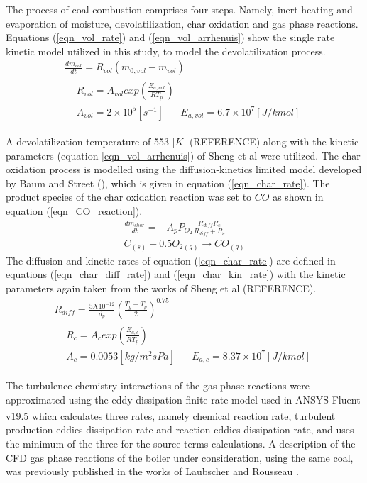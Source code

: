 \documentclass[review]{elsarticle}
\begin{document}
The process of coal combustion comprises four steps. Namely, inert heating and evaporation of moisture, devolatilization, char oxidation and gas phase reactions. Equations (\ref{eqn_vol_rate}) and (\ref{eqn_vol_arrhenuis}) show the single rate kinetic model utilized in this study, to model the devolatilization process.
\begin{gather}
\frac{dm_{vol}}{dt} = R_{vol}(m_{0,vol}-m_{vol}) \label{eqn_vol_rate} \\
\begin{split}
&R_{vol} = A_{vol}exp\left(\frac{E_{a,vol}}{RT_p}\right)\\
&A_{vol} = 2\times10^5 [s^{-1}]\,\,\,\,\,\,\,\,\,\,E_{a,vol} = 6.7\times10^7 [J/kmol] \label{eqn_vol_arrhenuis}
\end{split}
\end{gather}

A devolatilization temperature of 553 [$K$] (REFERENCE) along with the kinetic parameters (equation \ref{eqn_vol_arrhenuis}) of Sheng et al \cite{Sheng2004} were utilized. The char oxidation process is modelled using the diffusion-kinetics limited model developed by Baum and Street (\cite{Baum1971}), which is given in equation (\ref{eqn_char_rate}). The product species of the char oxidation reaction was set to $CO$ as shown in equation (\ref{eqn_CO_reaction}). 
\begin{gather}
\frac{dm_{char}}{dt} = -A_p P_{O_{2}} \frac{R_{diff}R_c}{R_{diff} + R_c}  \label{eqn_char_rate}\\
C_{(s)}+0.5O_{2(g)}\to CO_{(g)} \label{eqn_CO_reaction}
\end{gather}
The diffusion and kinetic rates of equation (\ref{eqn_char_rate}) are defined in equations (\ref{eqn_char_diff_rate})  and (\ref{eqn_char_kin_rate}) with the kinetic parameters again taken from the works of Sheng et al (REFERENCE).
\begin{gather}
R_{diff} = \frac{5X10^{-12}}{d_p} \left(\frac{T_g+T_p}{2}\right)^0.75 \label{eqn_char_diff_rate}\\
\begin{split}
&R_{c} = A_{c}exp\left(\frac{E_{a,c}}{RT_p}\right)\\
&A_{c} = 0.0053 [kg/m^2sPa]\,\,\,\,\,\,\,\,\,\,E_{a,c} = 8.37\times10^7 [J/kmol]
\end{split}
 \label{eqn_char_kin_rate}
\end{gather}

The turbulence-chemistry interactions of the gas phase reactions were approximated using the eddy-dissipation-finite rate model used in ANSYS Fluent v19.5\textsuperscript{\textregistered} which calculates three rates, namely chemical reaction rate, turbulent production eddies dissipation rate and reaction eddies dissipation rate, and uses the minimum of the three for the source terms calculations. A description of the CFD gas phase reactions of the boiler under consideration, using the same coal, was previously published in the works of Laubscher and Rousseau \cite{Laubscher2019b}.
\end{document}

